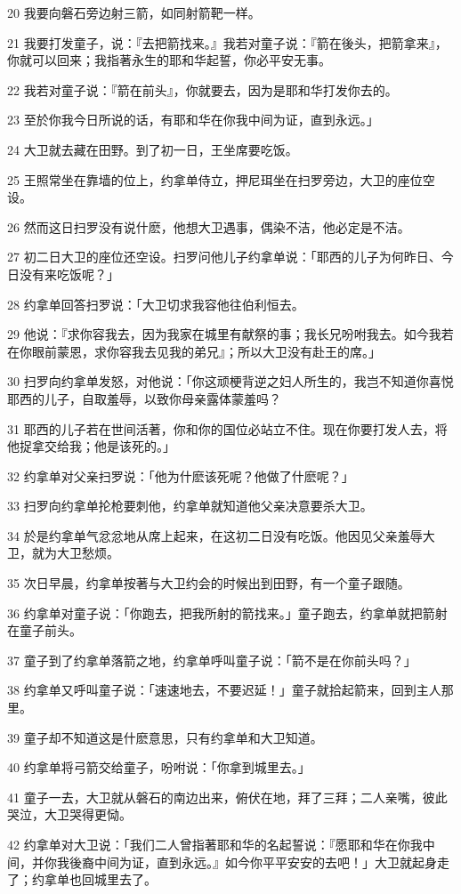 \par 20 我要向磐石旁边射三箭，如同射箭靶一样。
\par 21 我要打发童子，说：『去把箭找来。』我若对童子说：『箭在後头，把箭拿来』，你就可以回来；我指著永生的耶和华起誓，你必平安无事。
\par 22 我若对童子说：『箭在前头』，你就要去，因为是耶和华打发你去的。
\par 23 至於你我今日所说的话，有耶和华在你我中间为证，直到永远。」
\par 24 大卫就去藏在田野。到了初一日，王坐席要吃饭。
\par 25 王照常坐在靠墙的位上，约拿单侍立，押尼珥坐在扫罗旁边，大卫的座位空设。
\par 26 然而这日扫罗没有说什麽，他想大卫遇事，偶染不洁，他必定是不洁。
\par 27 初二日大卫的座位还空设。扫罗问他儿子约拿单说：「耶西的儿子为何昨日、今日没有来吃饭呢？」
\par 28 约拿单回答扫罗说：「大卫切求我容他往伯利恒去。
\par 29 他说：『求你容我去，因为我家在城里有献祭的事；我长兄吩咐我去。如今我若在你眼前蒙恩，求你容我去见我的弟兄』；所以大卫没有赴王的席。」
\par 30 扫罗向约拿单发怒，对他说：「你这顽梗背逆之妇人所生的，我岂不知道你喜悦耶西的儿子，自取羞辱，以致你母亲露体蒙羞吗？
\par 31 耶西的儿子若在世间活著，你和你的国位必站立不住。现在你要打发人去，将他捉拿交给我；他是该死的。」
\par 32 约拿单对父亲扫罗说：「他为什麽该死呢？他做了什麽呢？」
\par 33 扫罗向约拿单抡枪要刺他，约拿单就知道他父亲决意要杀大卫。
\par 34 於是约拿单气忿忿地从席上起来，在这初二日没有吃饭。他因见父亲羞辱大卫，就为大卫愁烦。
\par 35 次日早晨，约拿单按著与大卫约会的时候出到田野，有一个童子跟随。
\par 36 约拿单对童子说：「你跑去，把我所射的箭找来。」童子跑去，约拿单就把箭射在童子前头。
\par 37 童子到了约拿单落箭之地，约拿单呼叫童子说：「箭不是在你前头吗？」
\par 38 约拿单又呼叫童子说：「速速地去，不要迟延！」童子就拾起箭来，回到主人那里。
\par 39 童子却不知道这是什麽意思，只有约拿单和大卫知道。
\par 40 约拿单将弓箭交给童子，吩咐说：「你拿到城里去。」
\par 41 童子一去，大卫就从磐石的南边出来，俯伏在地，拜了三拜；二人亲嘴，彼此哭泣，大卫哭得更恸。
\par 42 约拿单对大卫说：「我们二人曾指著耶和华的名起誓说：『愿耶和华在你我中间，并你我後裔中间为证，直到永远。』如今你平平安安的去吧！」大卫就起身走了；约拿单也回城里去了。

